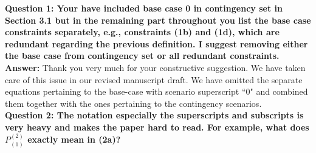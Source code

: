 \documentclass[8pt]{article}
\begin{document}
\textbf{Question 1: Your have included base case 0 in contingency set in Section 3.1 but in the remaining part throughout you list the base case constraints separately, e.g., constraints (1b) and (1d), which are redundant regarding the previous definition. I suggest removing either the base case from contingency set or all redundant constraints.}\\

\textbf{Answer: }Thank you very much for your constructive suggestion. We have taken care of this issue in our revised manuscript draft. We have omitted the separate equations pertaining to the base-case with scenario superscript ``0" and combined them together with the ones pertaining to the contingency scenarios.\\

\textbf{Question 2: The notation especially the superscripts and subscripts is very heavy and makes the paper hard to read. For example, what does $P^{(2)}_{(1)}$ exactly mean in (2a)?}\\
\end{document}
